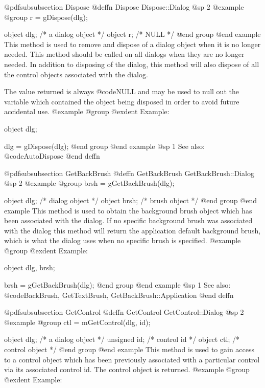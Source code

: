 @pdfsubsubsection {Dispose}
@deffn {Dispose} Dispose::Dialog
@sp 2
@example
@group
r = gDispose(dlg);

object  dlg;   /*  a dialog object   */
object  r;     /*  NULL              */
@end group
@end example
This method is used to remove and dispose of a dialog object when it
is no longer needed.  This method should be called on all dialogs
when they are no longer needed.  In addition to disposing of the dialog,
this method will also dispose of all the control objects associated
with the dialog.

The value returned is always @code{NULL} and may be used to null out
the variable which contained the object being disposed in order to
avoid future accidental use.
@example
@group
@exdent Example:

object  dlg;

dlg = gDispose(dlg);
@end group
@end example
@sp 1
See also:  @code{AutoDispose}
@end deffn










@pdfsubsubsection {GetBackBrush}
@deffn {GetBackBrush} GetBackBrush::Dialog
@sp 2
@example
@group
brsh = gGetBackBrush(dlg);

object  dlg;    /*  dialog object  */
object  brsh;   /*  brush object   */
@end group
@end example
This method is used to obtain the background brush object which has been
associated with the dialog.  If no specific background brush was
associated with the dialog this method will return the application
default background brush, which is what the dialog uses when no specific
brush is specified.
@example
@group
@exdent Example:

object  dlg, brsh;

brsh = gGetBackBrush(dlg);
@end group
@end example
@sp 1
See also:  @code{BackBrush, GetTextBrush, GetBackBrush::Application}
@end deffn









@pdfsubsubsection {GetControl}
@deffn {GetControl} GetControl::Dialog
@sp 2
@example
@group
ctl = mGetControl(dlg, id);

object  dlg;    /*  a dialog object  */
unsigned id;    /*  control id       */
object  ctl;    /*  control object   */
@end group
@end example
This method is used to gain access to a control object which has been
previously associated with a particular control via its associated
control id.  The control object is returned.
@example
@group
@exdent Example:

